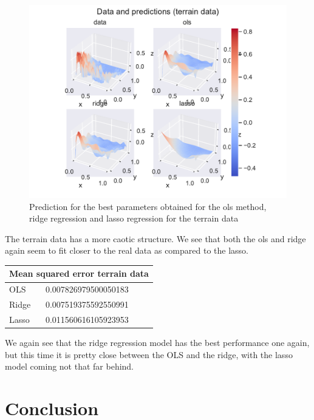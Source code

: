 \documentclass[12pt]{article}
\begin{document}
\begin{figure}[H]
    \centering
    \includegraphics[width=\columnwidth]{../src/output/prediction_all_models_terrain_data.pdf}
    \caption{Prediction for the best parameters obtained for the ols method, ridge regression and lasso regression for the terrain data}
    \label{fig:predictions_terrain_data}
\end{figure}

The terrain data has a more caotic structure.
We see that both the ols and ridge again seem to fit closer to the real data as compared to the lasso.

\vspace{0.5em}
\begin{tabular}{ |p{3cm}||p{6cm}|  }
 \hline
 \multicolumn{2}{|c|}{Mean squared error terrain data} \\
 \hline
 OLS & 0.007826979500050183  \\
 \hline
Ridge & 0.007519375592550991 \\
\hline
Lasso  & 0.011560616105923953 \\
\hline
\end{tabular}

\vspace{0.5em}
We again see that the ridge regression model has the best performance one again, but this time it is pretty close between the OLS and the ridge, with the lasso model coming not that far behind.


\section{Conclusion}
\end{document}

